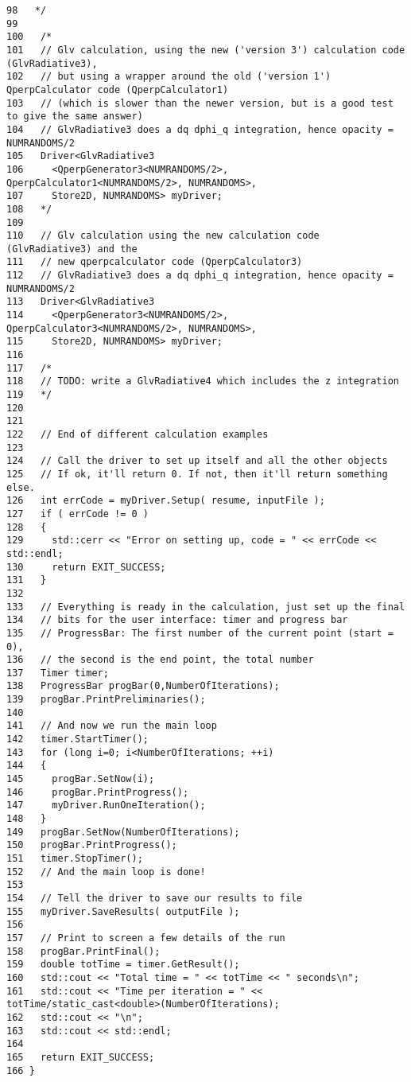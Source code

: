 \begin{Code}
\begin{verbatim}
98   */
99 
100   /*
101   // Glv calculation, using the new ('version 3') calculation code (GlvRadiative3),
102   // but using a wrapper around the old ('version 1') QperpCalculator code (QperpCalculator1)
103   // (which is slower than the newer version, but is a good test to give the same answer)
104   // GlvRadiative3 does a dq dphi_q integration, hence opacity = NUMRANDOMS/2
105   Driver<GlvRadiative3
106     <QperpGenerator3<NUMRANDOMS/2>, QperpCalculator1<NUMRANDOMS/2>, NUMRANDOMS>, 
107     Store2D, NUMRANDOMS> myDriver;
108   */
109   
110   // Glv calculation using the new calculation code (GlvRadiative3) and the
111   // new qperpcalculator code (QperpCalculator3)
112   // GlvRadiative3 does a dq dphi_q integration, hence opacity = NUMRANDOMS/2
113   Driver<GlvRadiative3
114     <QperpGenerator3<NUMRANDOMS/2>, QperpCalculator3<NUMRANDOMS/2>, NUMRANDOMS>, 
115     Store2D, NUMRANDOMS> myDriver;
116 
117   /*
118   // TODO: write a GlvRadiative4 which includes the z integration
119   */
120 
121 
122   // End of different calculation examples
123 
124   // Call the driver to set up itself and all the other objects
125   // If ok, it'll return 0. If not, then it'll return something else.
126   int errCode = myDriver.Setup( resume, inputFile );
127   if ( errCode != 0 )
128   {
129     std::cerr << "Error on setting up, code = " << errCode << std::endl;
130     return EXIT_SUCCESS;
131   }
132 
133   // Everything is ready in the calculation, just set up the final
134   // bits for the user interface: timer and progress bar
135   // ProgressBar: The first number of the current point (start = 0),
136   // the second is the end point, the total number
137   Timer timer;
138   ProgressBar progBar(0,NumberOfIterations);
139   progBar.PrintPreliminaries();
140   
141   // And now we run the main loop
142   timer.StartTimer();
143   for (long i=0; i<NumberOfIterations; ++i)
144   {
145     progBar.SetNow(i);
146     progBar.PrintProgress();
147     myDriver.RunOneIteration();
148   }
149   progBar.SetNow(NumberOfIterations);
150   progBar.PrintProgress();
151   timer.StopTimer();
152   // And the main loop is done!
153 
154   // Tell the driver to save our results to file
155   myDriver.SaveResults( outputFile );
156  
157   // Print to screen a few details of the run
158   progBar.PrintFinal();
159   double totTime = timer.GetResult();
160   std::cout << "Total time = " << totTime << " seconds\n";
161   std::cout << "Time per iteration = " << totTime/static_cast<double>(NumberOfIterations);
162   std::cout << "\n";
163   std::cout << std::endl;
164 
165   return EXIT_SUCCESS;
166 }
\end{verbatim}
\end{Code}


